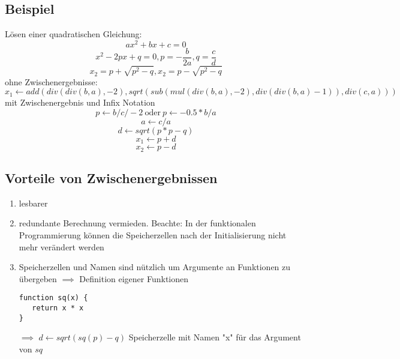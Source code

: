 \documentclass[a4paper]{scrartcl}
\theoremstyle{definition}
\theoremstyle{plain}
\theoremstyle{remark}
\theoremstyle{remark}
\begin{document}
\subsection{Beispiel}
\label{sec-6-1}
Lösen einer quadratischen Gleichung:
\[ax^2 + bx + c = 0\]
\[x^2 - 2px + q = 0, p = -\frac{b}{2a},q=\frac{c}{d}\]
\[x_2 = p + \sqrt{p^2 - q},x_2 = p - \sqrt{p^2 - q}\]
ohne Zwischenergebnisse:
\[x_1 \leftarrow add(div(div(b,a),-2),sqrt(sub(mul(div(b,a),-2),div(div(b,a)-1)),div(c,a)))\]
mit Zwischenergebnis und Infix Notation
\[p\leftarrow b / c / -2~\text{oder}~p\leftarrow -0.5 * b / a\]
\[a\leftarrow c / a\]
\[d\leftarrow sqrt(p*p - q)\]
\[x_1\leftarrow p + d\]
\[x_2\leftarrow p - d\]
\subsection{Vorteile von Zwischenergebnissen}
\label{sec-6-2}
\begin{enumerate}
\item lesbarer
\item redundante Berechnung vermieden. Beachte: In der funktionalen Programmierung können die Speicherzellen nach der Initialisierung nicht mehr verändert werden
\item Speicherzellen und Namen sind nützlich um Argumente an Funktionen zu übergeben $\implies$ Definition eigener Funktionen
\begin{verbatim}
function sq(x) {
   return x * x
}
\end{verbatim}
$\implies$ $d \leftarrow sqrt(sq(p) - q)$
Speicherzelle mit Namen "x" für das Argument von $sq$
\end{enumerate}
\end{document}

